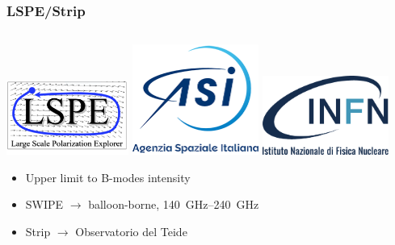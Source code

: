 \documentclass[10pt,aspectratio=169]{beamer}
\begin{document}
\begin{frame}
\frametitle{LSPE/Strip}

\begin{columns}
        \begin{column}{0.38\textwidth}
                \includegraphics[width=0.30\textwidth]{lspe}
                \includegraphics[width=0.31\textwidth]{Logo-ASI-2019}
                \includegraphics[width=0.31\textwidth]{Logo_INFN}
                \begin{itemize}
                        \item<2-> \alert{Upper limit} to B-modes intensity
                        \item<3-> \alert{SWIPE} $\rightarrow$
                        balloon-borne, \SIrange{140}{240}{\giga\hertz}
                        \item<4-> \alert{Strip} $\rightarrow$ Observatorio del
                        Teide
                \end{itemize}
        \end{column}
\end{columns}

\end{frame}
\end{document}

